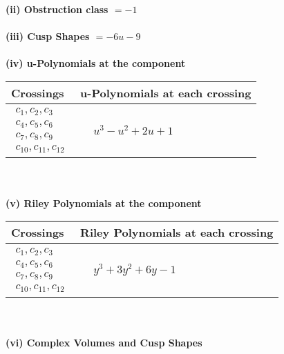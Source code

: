 \documentclass[1p]{elsarticle_modified}
\theoremstyle{definition}
\begin{document}
\flushleft \textbf{(ii) Obstruction class $= -1$}\\~\\
\flushleft \textbf{(iii) Cusp Shapes $= -6 u-9$}\\~\\
\newpage\renewcommand{\arraystretch}{1}
\flushleft \textbf{(iv) u-Polynomials at the component}\newline \\
\begin{tabular}{m{50pt}|m{274pt}}
Crossings & \hspace{64pt}u-Polynomials at each crossing \\
\hline $$\begin{aligned}c_{1},c_{2},c_{3}\\c_{4},c_{5},c_{6}\\c_{7},c_{8},c_{9}\\c_{10},c_{11},c_{12}\end{aligned}$$&$\begin{aligned}
&u^3- u^2+2 u+1
\end{aligned}$\\
\hline
\end{tabular}\\~\\
\newpage\renewcommand{\arraystretch}{1}
\flushleft \textbf{(v) Riley Polynomials at the component}\newline \\
\begin{tabular}{m{50pt}|m{274pt}}
Crossings & \hspace{64pt}Riley Polynomials at each crossing \\
\hline $$\begin{aligned}c_{1},c_{2},c_{3}\\c_{4},c_{5},c_{6}\\c_{7},c_{8},c_{9}\\c_{10},c_{11},c_{12}\end{aligned}$$&$\begin{aligned}
&y^3+3 y^2+6 y-1
\end{aligned}$\\
\hline
\end{tabular}\\~\\
\newpage\flushleft \textbf{(vi) Complex Volumes and Cusp Shapes}
\end{document}
